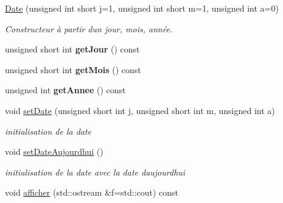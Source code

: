 \begin{DoxyCompactItemize}
\item 
\hyperlink{class_t_i_m_e_1_1_date_ab0d72ce6e986c0c0a5f2902e586cf81a}{Date} (unsigned int short j=1, unsigned int short m=1, unsigned int a=0)
\begin{DoxyCompactList}\small\item\em Constructeur à partir d\textquotesingle{}un jour, mois, année. \end{DoxyCompactList}\item 
\hypertarget{class_t_i_m_e_1_1_date_a4af978b7df2b738f62449b0a7e53c21d}{}unsigned short int {\bfseries get\+Jour} () const \label{class_t_i_m_e_1_1_date_a4af978b7df2b738f62449b0a7e53c21d}

\item 
\hypertarget{class_t_i_m_e_1_1_date_a6cb9d945143df216115419c4cb8b14ce}{}unsigned short int {\bfseries get\+Mois} () const \label{class_t_i_m_e_1_1_date_a6cb9d945143df216115419c4cb8b14ce}

\item 
\hypertarget{class_t_i_m_e_1_1_date_a07b41b2e9e85ef78bf13689e772bef7d}{}unsigned int {\bfseries get\+Annee} () const \label{class_t_i_m_e_1_1_date_a07b41b2e9e85ef78bf13689e772bef7d}

\item 
\hypertarget{class_t_i_m_e_1_1_date_a7419902750e61b9473ab05ccd5ced33d}{}void \hyperlink{class_t_i_m_e_1_1_date_a7419902750e61b9473ab05ccd5ced33d}{set\+Date} (unsigned short int j, unsigned short int m, unsigned int a)\label{class_t_i_m_e_1_1_date_a7419902750e61b9473ab05ccd5ced33d}

\begin{DoxyCompactList}\small\item\em initialisation de la date \end{DoxyCompactList}\item 
\hypertarget{class_t_i_m_e_1_1_date_ace4be52a503c45de93b8db92dc592d93}{}void \hyperlink{class_t_i_m_e_1_1_date_ace4be52a503c45de93b8db92dc592d93}{set\+Date\+Aujourdhui} ()\label{class_t_i_m_e_1_1_date_ace4be52a503c45de93b8db92dc592d93}

\begin{DoxyCompactList}\small\item\em initialisation de la date avec la date d\textquotesingle{}aujourd\textquotesingle{}hui \end{DoxyCompactList}\item 
\hypertarget{class_t_i_m_e_1_1_date_aa45188755f5d9d17cbebf0e55d3c571b}{}void \hyperlink{class_t_i_m_e_1_1_date_aa45188755f5d9d17cbebf0e55d3c571b}{afficher} (std\+::ostream \&f=std\+::cout) const \label{class_t_i_m_e_1_1_date_aa45188755f5d9d17cbebf0e55d3c571b}


\end{DoxyCompactItemize}
